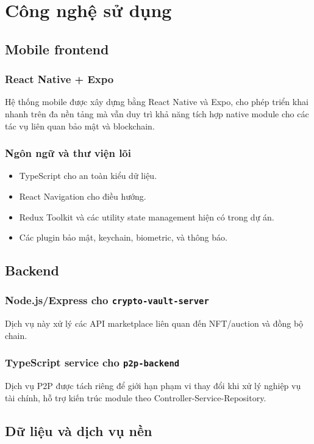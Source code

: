 \documentclass[a4paper,12pt]{report}
\begin{document}
\chapter{Công nghệ sử dụng}

\section{Mobile frontend}
\subsection{React Native + Expo}
Hệ thống mobile được xây dựng bằng React Native và Expo, cho phép triển khai nhanh trên đa nền tảng mà vẫn duy trì khả năng tích hợp native module cho các tác vụ liên quan bảo mật và blockchain.

\subsection{Ngôn ngữ và thư viện lõi}
\begin{itemize}
    \item TypeScript cho an toàn kiểu dữ liệu.
    \item React Navigation cho điều hướng.
    \item Redux Toolkit và các utility state management hiện có trong dự án.
    \item Các plugin bảo mật, keychain, biometric, và thông báo.
\end{itemize}

\section{Backend}
\subsection{Node.js/Express cho \texttt{crypto-vault-server}}
Dịch vụ này xử lý các API marketplace liên quan đến NFT/auction và đồng bộ chain.

\subsection{TypeScript service cho \texttt{p2p-backend}}
Dịch vụ P2P được tách riêng để giới hạn phạm vi thay đổi khi xử lý nghiệp vụ tài chính, hỗ trợ kiến trúc module theo Controller-Service-Repository.

\section{Dữ liệu và dịch vụ nền}
\end{document}
